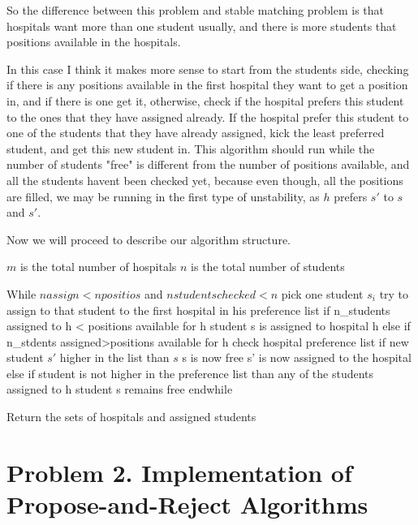 \documentclass{article}
\begin{document}
So the difference between this problem and stable matching problem is that hospitals want more than one student usually, and there is more students that positions available in the hospitals.

In this case I think it makes more sense to start from the students side, checking if there is any positions available in the first hospital they want to get a position in, and if there is one get it, otherwise, check if the hospital prefers this student to the ones that they have assigned already. If the hospital prefer this student to one of the students that they have already assigned, kick the least preferred student, and get this new student in. This algorithm should run while the number of students "free" is different from the number of positions available, and all the students havent been checked yet, because even though, all the positions are filled, we may be running in the first type of unstability, as $h$ prefers $s'$ to $s$ and $s'$.

Now we will proceed to describe our algorithm structure.

$m$ is the total number of hospitals
$n$ is the total number of students

While $nassign<npositios$ and $nstudentschecked<n$
 pick one student $s_i$
 try to assign to that student to the first hospital in his preference list
 if n_students assigned to h < positions available for h
  student s is assigned to hospital h
 else if n_stdents assigned>positions available for h
  check hospital preference list
  if new student $s'$ higher in the list than $s$
   s is now free
   s' is now assigned to the hospital
  else if student is not higher in the preference list than any of the students assigned to h
   student s remains free
endwhile

Return the sets of hospitals and assigned students
  

\section*{Problem 2. Implementation of Propose-and-Reject Algorithms}
\end{document}

